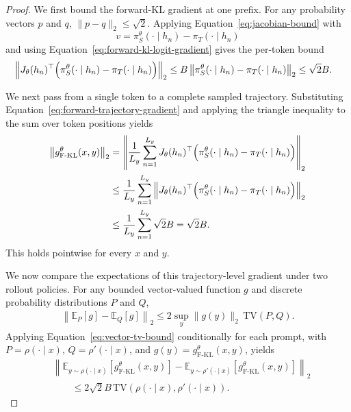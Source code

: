 \documentclass{article} %
\theoremstyle{plain}
\theoremstyle{definition}
\theoremstyle{remark}
\begin{document}
\begin{proof}
We first bound the forward-KL gradient at one prefix.  For any probability
vectors $p$ and $q$, $\lVert p-q\rVert_2\le\sqrt2$.  Applying
Equation~\ref{eq:jacobian-bound} with
\begin{equation}
    v=\pi_S^\theta(\cdot\mid h_n)-\pi_T(\cdot\mid h_n)
\end{equation}
and using Equation~\ref{eq:forward-kl-logit-gradient} gives the per-token
bound
\begin{align}
    &\left\lVert
        J_\theta(h_n)^\top
        \Bigl(
            \pi_S^\theta(\cdot\mid h_n)
            -\pi_T(\cdot\mid h_n)
        \Bigr)
    \right\rVert_2
    \le
    B\left\lVert
        \pi_S^\theta(\cdot\mid h_n)
        -\pi_T(\cdot\mid h_n)
    \right\rVert_2
    \le\sqrt2B.
    \label{eq:forward-token-gradient-bound}
\end{align}

We next pass from a single token to a complete sampled trajectory.  Substituting
Equation~\ref{eq:forward-trajectory-gradient} and applying the triangle
inequality to the sum over token positions yields
\begin{align}
    \left\lVert
        g_{\mathrm{F\text{-}KL}}^\theta(x,y)
    \right\rVert_2
    &=
    \left\lVert
        \frac{1}{L_y}\sum_{n=1}^{L_y}
        J_\theta(h_n)^\top
        \Bigl(
            \pi_S^\theta(\cdot\mid h_n)
            -\pi_T(\cdot\mid h_n)
        \Bigr)
    \right\rVert_2\\
    &\le
    \frac{1}{L_y}\sum_{n=1}^{L_y}
    \left\lVert
        J_\theta(h_n)^\top
        \Bigl(
            \pi_S^\theta(\cdot\mid h_n)
            -\pi_T(\cdot\mid h_n)
        \Bigr)
    \right\rVert_2\\
    &\le
    \frac{1}{L_y}\sum_{n=1}^{L_y}\sqrt2B
    =\sqrt2B.
    \label{eq:forward-trajectory-gradient-bound}
\end{align}
This holds pointwise for every $x$ and $y$.

We now compare the expectations of this trajectory-level gradient under two
rollout policies.  For any bounded vector-valued function $g$ and discrete
probability distributions $P$ and $Q$,
\begin{align}
    \left\lVert
        \mathbb E_P[g]-\mathbb E_Q[g]
    \right\rVert_2
    \le
    2\sup_y\lVert g(y)\rVert_2\,\mathrm{TV}(P,Q).
    \label{eq:vector-tv-bound}
\end{align}
Applying Equation~\ref{eq:vector-tv-bound} conditionally for each prompt,
with $P=\rho(\cdot\mid x)$, $Q=\rho'(\cdot\mid x)$, and
$g(y)=g_{\mathrm{F\text{-}KL}}^\theta(x,y)$, yields
\begin{align}
    &\left\lVert
        \mathbb E_{y\sim\rho(\cdot\mid x)}
        \left[g_{\mathrm{F\text{-}KL}}^\theta(x,y)\right]
        -
        \mathbb E_{y\sim\rho'(\cdot\mid x)}
        \left[g_{\mathrm{F\text{-}KL}}^\theta(x,y)\right]
    \right\rVert_2\nonumber\\
    &\qquad\le
    2\sqrt2B\,
    \mathrm{TV}\!\left(
        \rho(\cdot\mid x),
        \rho'(\cdot\mid x)
    \right).
\end{align}


\end{proof}
\end{document}
